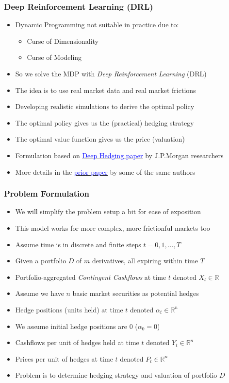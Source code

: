 \documentclass{beamer}
\begin{document}
\begin{frame}
\frametitle{Deep Reinforcement Learning (DRL)}
\begin{itemize}
\item Dynamic Programming not suitable in practice due to:
\begin{itemize}
\item Curse of Dimensionality
\item Curse of Modeling
\end{itemize}
\item So we solve the MDP with {\em Deep Reinforcement Learning} (DRL)
\item The idea is to use real market data and real market frictions
\item Developing realistic simulations to derive the optimal policy
\item The optimal policy gives us the (practical) hedging strategy
\item The optimal value function gives us the price (valuation)
\item Formulation based on \href{https://papers.ssrn.com/sol3/papers.cfm?abstract_id=3355706}{\underline{\textcolor{blue}{Deep Hedging paper}}} by J.P.Morgan researchers
\item More details in the \href{https://papers.ssrn.com/sol3/papers.cfm?abstract_id=3355706}{\underline{\textcolor{blue}{prior paper}}} by some of the same authors
\end{itemize}
\end{frame}

\begin{frame}
\frametitle{Problem Formulation}
\begin{itemize}
\item We will simplify the problem setup a bit for ease of exposition
\item This model works for more complex, more frictionful markets too
\item Assume time is in discrete and finite steps $t = 0, 1, \ldots, T$
\item Given a portfolio $D$ of $m$ derivatives, all expiring within time $T$
\item Portfolio-aggregated {\em Contingent Cashflows} at time $t$ denoted $X_t \in \mathbb{R}$
\item Assume we have $n$ basic market securities as potential hedges
\item Hedge positions (units held) at time $t$ denoted $\alpha_t \in \mathbb{R}^n$
\item We assume initial hedge positions are 0 ($\alpha_0 = 0$)
\item Cashflows per unit of hedges held at time $t$ denoted $Y_t \in \mathbb{R}^n$
\item Prices per unit of hedges at time $t$ denoted $P_t \in \mathbb{R}^n$
\item Problem is to determine hedging strategy and valuation of portfolio $D$
\end{itemize}
\end{frame}
\end{document}
